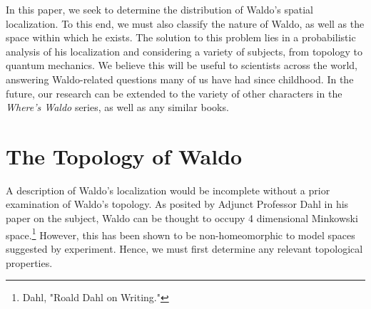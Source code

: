 \documentclass{article}
\begin{document}
In this paper, we seek to determine the distribution of Waldo's spatial localization. To this end, we must also classify the nature of Waldo, as well as the space within which he exists. The solution to this problem lies in a probabilistic analysis of his localization and considering a variety of subjects, from topology to quantum mechanics. We believe this will be useful to scientists across the world, answering Waldo-related questions many of us have had since childhood. In the future, our research can be extended to the variety of other characters in the \emph{Where's Waldo} series, as well as any similar books.

\section{The Topology of Waldo}
A description of Waldo's localization would be incomplete without a prior examination of Waldo's topology. As posited by Adjunct Professor Dahl in his paper on the subject, Waldo can be thought to occupy 4 dimensional Minkowski space.\footnote{Dahl, "Roald Dahl on Writing."} However, this has been shown to be non-homeomorphic to model spaces suggested by experiment. Hence, we must first determine any relevant topological properties.
\end{document}

